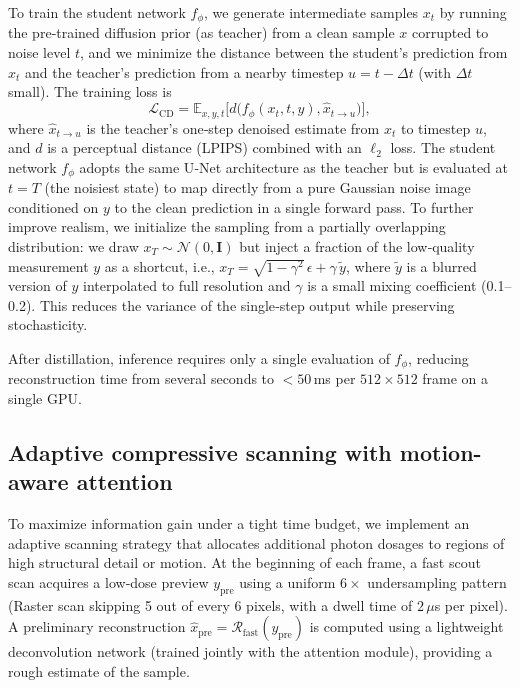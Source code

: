 \documentclass{article}
\begin{document}
To train the student network $f_\phi$, we generate intermediate samples $x_t$ by running the pre‑trained diffusion prior (as teacher) from a clean sample $x$ corrupted to noise level $t$, and we minimize the distance between the student’s prediction from $x_t$ and the teacher’s prediction from a nearby timestep $u = t - \Delta t$ (with $\Delta t$ small). The training loss is
\begin{equation}
\mathcal{L}_{\mathrm{CD}} = \mathbb{E}_{x,y,t}\big[ d\big(f_\phi(x_t, t, y), \hat{x}_{t\to u}\big) \big],
\end{equation}
where $\hat{x}_{t\to u}$ is the teacher’s one‑step denoised estimate from $x_t$ to timestep $u$, and $d$ is a perceptual distance (LPIPS) combined with an $\ell_2$ loss. The student network $f_\phi$ adopts the same U‑Net architecture as the teacher but is evaluated at $t=T$ (the noisiest state) to map directly from a pure Gaussian noise image conditioned on $y$ to the clean prediction in a single forward pass. To further improve realism, we initialize the sampling from a partially overlapping distribution: we draw $x_T \sim \mathcal{N}(0,\mathbf{I})$ but inject a fraction of the low‑quality measurement $y$ as a shortcut, i.e., $x_T = \sqrt{1-\gamma^2}\, \epsilon + \gamma \,\tilde{y}$, where $\tilde{y}$ is a blurred version of $y$ interpolated to full resolution and $\gamma$ is a small mixing coefficient (0.1–0.2). This reduces the variance of the single‑step output while preserving stochasticity.

After distillation, inference requires only a single evaluation of $f_\phi$, reducing reconstruction time from several seconds to $< 50$\,ms per $512\times 512$ frame on a single GPU.

\subsection{Adaptive compressive scanning with motion-aware attention}
To maximize information gain under a tight time budget, we implement an adaptive scanning strategy that allocates additional photon dosages to regions of high structural detail or motion. At the beginning of each frame, a fast scout scan acquires a low‑dose preview $y_{\mathrm{pre}}$ using a uniform $6\times$ undersampling pattern (Raster scan skipping 5 out of every 6 pixels, with a dwell time of $2\,\mu$s per pixel). A preliminary reconstruction $\hat{x}_{\mathrm{pre}} = \mathcal{R}_{\mathrm{fast}}(y_{\mathrm{pre}})$ is computed using a lightweight deconvolution network (trained jointly with the attention module), providing a rough estimate of the sample.
\end{document}
